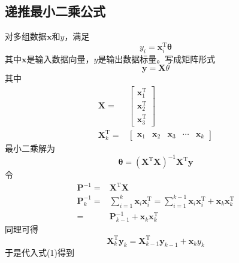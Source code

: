 \subsection{递推最小二乘公式}
对多组数据$\boldsymbol{x}$和$y$，满足
\[y_i = \boldsymbol{x}^\mathrm{T}_i\boldsymbol{\theta}\]
其中$\boldsymbol{x}$是输入数据向量，$y$是输出数据标量。写成矩阵形式
\[\boldsymbol{y} = \mathbf{X}\theta\]
其中
\begin{align*}
    \mathbf{X} =& \left[\begin{matrix}
        \boldsymbol{x}^\mathrm{T}_1 \\
        \boldsymbol{x}^\mathrm{T}_2 \\
        \boldsymbol{x}^\mathrm{T}_3
    \end{matrix}\right] \\
    \mathbf{X}^\mathrm{T}_k =& \left[\begin{matrix}
        \boldsymbol{x}_1 & \boldsymbol{x}_2 & \boldsymbol{x}_3 &
        \cdots & \boldsymbol{x}_k
    \end{matrix}\right]
\end{align*}
最小二乘解为
\begin{equation*}
    \boldsymbol{\theta}
    =(\mathbf{X}^\mathrm{T}\mathbf{X})^{-1}
    \mathbf{X}^\mathrm{T}\boldsymbol{y}\tag{2.1}
\end{equation*}
令
\begin{align*}
    \mathbf{P}^{-1} =& \mathbf{X}^\mathrm{T}\mathbf{X} \\
    \mathbf{P}_k^{-1} =& \sum_{i=1}^k\boldsymbol{x}_i\boldsymbol{x}^\mathrm{T}_i
    = \sum_{i=1}^{k-1}\boldsymbol{x}_i\boldsymbol{x}^\mathrm{T}_i
    +\boldsymbol{x}_k\boldsymbol{x}^\mathrm{T}_k \\
    =& \mathbf{P}_{k-1}^{-1} + \boldsymbol{x}_k\boldsymbol{x}_k^\mathrm{T}
\end{align*}
同理可得
\begin{equation*}
    \mathbf{X}_k^\mathrm{T}\boldsymbol{y}_k
    =\mathbf{X}_{k-1}^\mathrm{T}\boldsymbol{y}_{k-1}
    +\boldsymbol{x}_ky_k
\end{equation*}
于是代入式(1)得到
